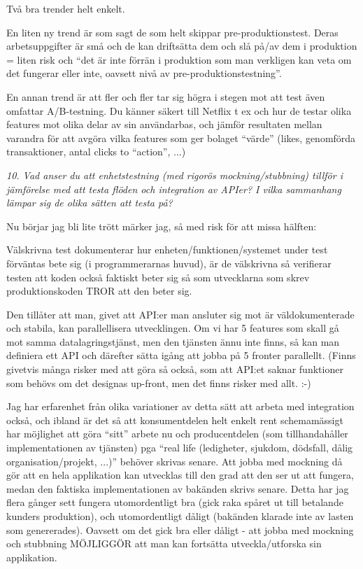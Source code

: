 \documentclass[11pt]{article}
\begin{document}
Två bra trender helt enkelt.

En liten ny trend är som sagt de som helt skippar pre-produktionstest.
Deras arbetsuppgifter är små och de kan driftsätta dem och slå på/av dem
i produktion = liten risk och ``det är inte förrän i produktion som man
verkligen kan veta om det fungerar eller inte, oavsett nivå av
pre-produktionstestning''.

En annan trend är att fler och fler tar sig högra i stegen mot att test
även omfattar A/B-testning. Du känner säkert till Netflix t ex och hur
de testar olika features mot olika delar av sin användarbas, och jämför
resultaten mellan varandra för att avgöra vilka features som ger bolaget
``värde'' (likes, genomförda transaktioner, antal clicks to ``action'', ...)

\emph{10. Vad anser du att enhetstestning (med rigorös mockning/stubbning)
tillför i jämförelse med att testa flöden och integration av APIer? I
vilka sammanhang lämpar sig de olika sätten att testa på?}

Nu börjar jag bli lite trött märker jag, så med risk för att missa
hälften:

Välskrivna test dokumenterar hur enheten/funktionen/systemet under
test förväntas bete sig (i programmerarnas huvud), är de välskrivna så
verifierar testen att koden också faktiskt beter sig så som utvecklarna
som skrev produktionskoden TROR att den beter sig.

Den tillåter att man, givet att API:er man ansluter sig mot är
väldokumenterade och stabila, kan parallellisera utvecklingen. Om vi har
5 features som skall gå mot samma datalagringstjänst, men den tjänsten
ännu inte finns, så kan man definiera ett API och därefter sätta igång
att jobba på 5 fronter parallellt. (Finns givetvis många risker med att
göra så också, som att API:et saknar funktioner som behövs om det
designas up-front, men det finns risker med allt. :-)

Jag har erfarenhet från olika variationer av detta sätt att arbeta med
integration också, och ibland är det så att konsumentdelen helt enkelt
rent schemamässigt har möjlighet att göra ``sitt'' arbete nu och
producentdelen (som tillhandahåller implementationen av tjänsten) pga
``real life (ledigheter, sjukdom, dödsfall, dålig
organisation/projekt, ...)'' behöver skrivas senare. Att jobba med
mockning då gör att en hela applikation kan utvecklas till den grad att
den ser ut att fungera, medan den faktiska implementationen av bakänden
skrivs senare. Detta har jag flera gånger sett fungera utomordentligt
bra (gick raka spåret ut till betalande kunders produktion), och
utomordentligt dåligt (bakänden klarade inte av lasten som genererades).
Oavsett om det gick bra eller dåligt - att jobba med mockning och
stubbning MÖJLIGGÖR att man kan fortsätta utveckla/utforska sin
applikation.
\end{document}
